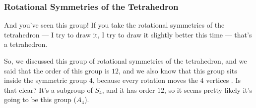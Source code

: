 \begin{hidden}
\end{hidden}

\subsubsection{Rotational Symmetries of the Tetrahedron}

\begin{speech}[00:40:28 - 00:41:16]
And you've seen this group! If you take the rotational symmetries of the tetrahedron --- I try to draw it, I try to draw it slightly better this time  --- that's a tetrahedron.

So, we discussed this group of rotational symmetries of the tetrahedron, and we said that the order of this group is $12$, and we also know that this group sits inside the symmetric group $4$, because every rotation moves the $4$ vertices . Is that clear? It's a subgroup of $S_4$, and it has order $12$, so it seems pretty likely it's going to be this group ($A_4$).
\end{speech}

